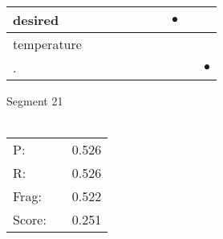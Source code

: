 \documentclass[landscape]{article}
\newcommand{\ssp}{\hspace{2pt}}
\newcommand{\mex}{\cellcolor{g}$\bullet$}
\begin{document}
\begin{tabular}{|l|p{10pt}|p{10pt}|p{10pt}|p{10pt}|p{10pt}|p{10pt}|p{10pt}|p{10pt}|p{10pt}|}
\hline
\ssp \cellcolor{ref6}desired \ssp&\hspace{2pt}&\hspace{2pt}&\hspace{2pt}&\hspace{2pt}&\hspace{2pt}&\hspace{2pt}&\hspace{2pt}\mex&\hspace{2pt}&\hspace{2pt}\\
\hline
\ssp temperature \ssp&\hspace{2pt}&\hspace{2pt}&\hspace{2pt}&\hspace{2pt}&\hspace{2pt}&\hspace{2pt}&\hspace{2pt}&\hspace{2pt}&\hspace{2pt}\\
\hline
\ssp \cellcolor{ref8}. \ssp&\hspace{2pt}&\hspace{2pt}&\hspace{2pt}&\hspace{2pt}&\hspace{2pt}&\hspace{2pt}&\hspace{2pt}&\hspace{2pt}&\hspace{2pt}\mex\\
\hline
\end{tabular}

\vspace{6pt}
\noindent Segment 21\\\\
\noindent\begin{tabular}{lm{12pt}r}
\hline
P:&&0.526\\
R:&&0.526\\
Frag:&&0.522\\
Score:&&0.251\\
\end{tabular}

\newpage
\end{document}
